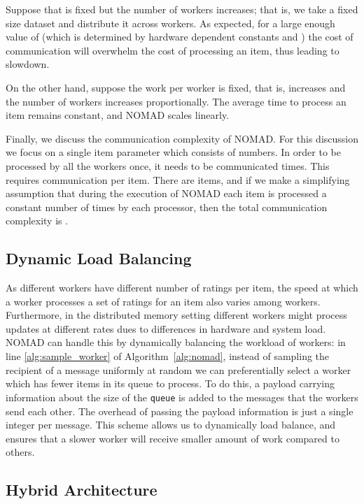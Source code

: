 \documentclass{vldb}
\begin{document}
Suppose that  is fixed but the number of workers 
increases; that is, we take a fixed size dataset and distribute it
across  workers. As expected, for a large enough value of 
(which is determined by hardware dependent constants  and ) the
cost of communication will overwhelm the cost of processing an item,
thus leading to slowdown.

On the other hand, suppose the work per worker is fixed, that is,
 increases and the number of workers  increases
proportionally. The average time  to
process an item remains constant, and NOMAD scales linearly.

Finally, we discuss the communication complexity of NOMAD. For this
discussion we focus on a single item parameter  which consists
of  numbers. In order to be processed by all the  workers
once, it needs to be communicated  times. This requires 
communication per item. There are  items, and if we make a
simplifying assumption that during the execution of NOMAD each item is
processed a constant  number of times by each processor, then the
total communication complexity is .

\subsection{Dynamic Load Balancing}
\label{sec:dynamic_load_balancing}

As different workers have different number of ratings per item, the
speed at which a worker processes a set of ratings 
for an item  also varies among workers.  Furthermore, in the
distributed memory setting different workers might process updates at
different rates dues to differences in hardware and system load.
NOMAD can handle this by dynamically balancing the workload of
workers: in line \ref{alg:sample_worker} of Algorithm~\ref{alg:nomad},
instead of sampling the recipient of a message uniformly at random we
can preferentially select a worker which has fewer items in its queue
to process. To do this, a payload carrying information about the size
of the \texttt{queue} is added to the messages that the workers
send each other. The overhead of passing the payload information is
just a single integer per message. This scheme allows us to
dynamically load balance, and ensures that a slower worker will
receive smaller amount of work compared to others.

\subsection{Hybrid Architecture}
\label{sec:multi_multi}
\end{document}
